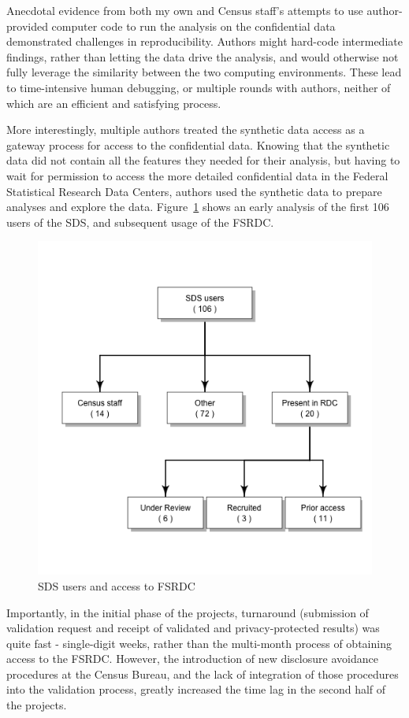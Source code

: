 \documentclass[inline]{hdsr}
\begin{document}
Anecdotal evidence from both my own and Census staff's attempts to use author-provided computer code to run the analysis on the confidential data demonstrated challenges in reproducibility. Authors might hard-code intermediate findings, rather than letting the data drive the analysis, and would otherwise not fully leverage the similarity between the two computing environments. These lead to time-intensive human debugging, or multiple rounds with authors, neither of which are an efficient and satisfying process. 

More interestingly, multiple authors treated the synthetic data access as a gateway process for access to the confidential data. Knowing that the synthetic data did not contain all the features they needed for their analysis, but having to wait for permission to access the more detailed confidential data in the Federal Statistical Research Data Centers, authors used the synthetic data to prepare analyses and explore the data. Figure~\ref{fig:useRDC} shows an early analysis of the first 106 users of the \ac{SDS}, and subsequent usage of the FSRDC. 

\begin{figure}
    \centering
    \includegraphics[width=0.5\linewidth]{useRDCgraph.png}
    \caption{SDS users and access to FSRDC}
    \label{fig:useRDC}
\end{figure}

Importantly, in the initial phase of the projects, turnaround (submission of validation request and receipt of validated and privacy-protected results) was quite fast - single-digit weeks, rather than the multi-month process of obtaining access to the FSRDC. However, the introduction of new disclosure avoidance procedures at the Census Bureau, and the lack of integration of those procedures into the validation process, greatly increased the time lag in the second half of the projects.
\end{document}

